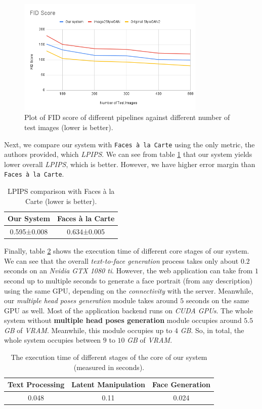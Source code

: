 \begin{figure}[H]
    \centering
    \includegraphics[width=0.8\textwidth]{images/fid_score.png}
    \caption{Plot of FID score of different pipelines against different number of test images (lower is better).}
    \label{fig:fid}
\end{figure}

Next, we compare our system with \texttt{Faces à la Carte} using the only metric, the authors provided, which \emph{LPIPS}. We can see from table \ref{tab:lpips_comp} that our system yields lower overall \emph{LPIPS}, which is better. However, we have higher error margin than \texttt{Faces à la Carte}.

\begin{table}[ht]
\centering
\begin{tabular}[t]{| c | c |}
\hline
Our System & Faces à la Carte \\
\hline
\hline
0.595±0.008 & 0.634±0.005 \\
\hline
\end{tabular}
\caption{LPIPS comparison with Faces à la Carte (lower is better).}
\label{tab:lpips_comp}
\end{table}

Finally, table \ref{tab:exec_time} shows the execution time of different core stages of our system. We can see that the overall \emph{text-to-face generation} process takes only about $0.2$ seconds on an \emph{Nvidia GTX 1080 ti}. However, the web application can take from $1$ second up to multiple seconds to generate a face portrait (from any description) using the same GPU, depending on the \emph{connectivity} with the server. Meanwhile, our \emph{multiple head poses generation} module takes around $5$ seconds on the same GPU as well. Most of the application backend runs on \emph{CUDA GPUs}. The whole system without \textbf{multiple head poses generation} module occupies around $5.5$ \emph{GB} of \emph{VRAM}. Meanwhile, this module occupies up to $4$ \emph{GB}. So, in total, the whole system occupies between $9$ to $10$ \emph{GB} of \emph{VRAM}.

\begin{table}[ht]
\centering
\begin{tabular}[t]{| c | c | c |}
\hline
Text Processing & Latent Manipulation & Face Generation \\
\hline
\hline
0.048 & 0.11 & 0.024 \\
\hline
\end{tabular}
\caption{The execution time of different stages of the core of our system (measured in seconds).}
\label{tab:exec_time}
\end{table}
